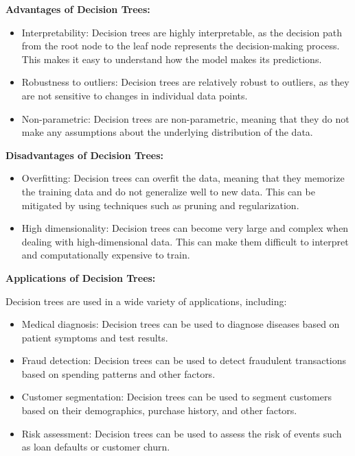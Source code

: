 \textbf{Advantages of Decision Trees:}

\begin{itemize}
    \item Interpretability: Decision trees are highly interpretable, as the decision path from the root node to the leaf node represents the decision-making process. This makes it easy to understand how the model makes its predictions.

    \item Robustness to outliers: Decision trees are relatively robust to outliers, as they are not sensitive to changes in individual data points.

    \item Non-parametric: Decision trees are non-parametric, meaning that they do not make any assumptions about the underlying distribution of the data.

\end{itemize}
\textbf{Disadvantages of Decision Trees:}

\begin{itemize}
    \item Overfitting: Decision trees can overfit the data, meaning that they memorize the training data and do not generalize well to new data. This can be mitigated by using techniques such as pruning and regularization.

    \item High dimensionality: Decision trees can become very large and complex when dealing with high-dimensional data. This can make them difficult to interpret and computationally expensive to train.

\end{itemize}
\textbf{Applications of Decision Trees:}

Decision trees are used in a wide variety of applications, including:

\begin{itemize}
    \item Medical diagnosis: Decision trees can be used to diagnose diseases based on patient symptoms and test results.

    \item Fraud detection: Decision trees can be used to detect fraudulent transactions based on spending patterns and other factors.

    \item Customer segmentation: Decision trees can be used to segment customers based on their demographics, purchase history, and other factors.

    \item Risk assessment: Decision trees can be used to assess the risk of events such as loan defaults or customer churn.

\end{itemize}

